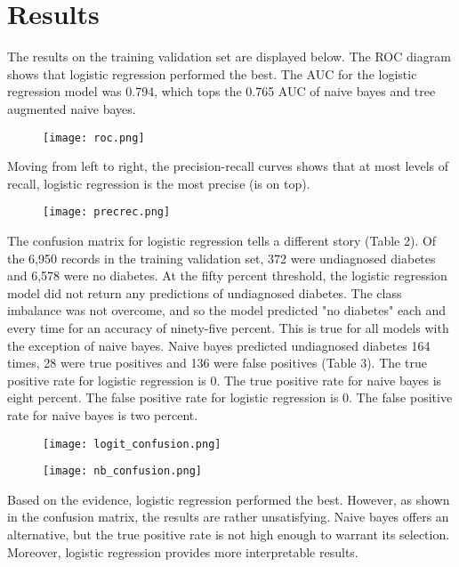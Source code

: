 \documentclass[twoside,11pt]{article}
\begin{document}
\section{Results} \label{results}

The results on the training validation set are displayed below. The ROC diagram shows that logistic regression performed the best. The AUC for the logistic regression model was 0.794, which tops the 0.765 AUC of naive bayes and tree augmented naive bayes.

\begin{figure}[htbp]
  \centering 
  \texttt{[image: roc.png]} 
  \label{fig:2} 
\end{figure} 

Moving from left to right, the precision-recall curves shows that at most levels of recall, logistic regression is the most precise (is on top). 

\begin{figure}[htbp]
  \centering 
  \texttt{[image: precrec.png]} 
  \label{fig:3} 
\end{figure} 

The confusion matrix for logistic regression tells a different story (Table 2). Of the 6,950 records in the training validation set, 372 were undiagnosed diabetes and 6,578 were no diabetes. At the fifty percent threshold, the logistic regression model did not return any predictions of undiagnosed diabetes. The class imbalance was not overcome, and so the model predicted "no diabetes" each and every time for an accuracy of ninety-five percent. This is true for all models with the exception of naive bayes. Naive bayes predicted undiagnosed diabetes 164 times, 28 were true positives and 136 were false positives (Table 3). The true positive rate for logistic regression is 0. The true positive rate for naive bayes is eight percent. The false positive rate for logistic regression is 0. The false positive rate for naive bayes is two percent. 

\begin{figure}[htbp]
  \centering 
  \texttt{[image: logit\_confusion.png]} 
  \label{fig:4} 
\end{figure} 

\begin{figure}[htbp]
  \centering 
  \texttt{[image: nb\_confusion.png]} 
  \label{fig:5} 
\end{figure} 

Based on the evidence, logistic regression performed the best. However, as shown in the confusion matrix, the results are rather unsatisfying. Naive bayes offers an alternative, but the true positive rate is not high enough to warrant its selection. Moreover, logistic regression provides more interpretable results. 
\end{document}
